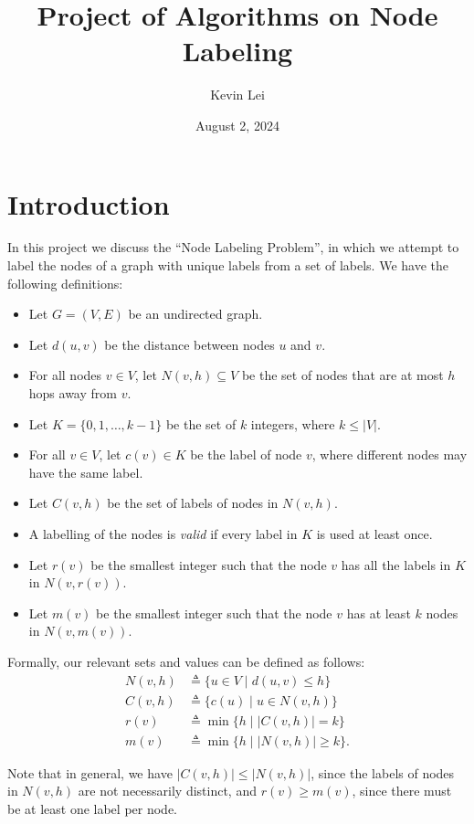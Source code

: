 \documentclass{article}
\title{Project of Algorithms on Node Labeling}
\author{Kevin Lei}
\date{August 2, 2024}
\begin{document}
\maketitle

\section{Introduction}

In this project we discuss the ``Node Labeling Problem'', in which we attempt to label the nodes of a graph with unique labels from a set of labels.
We have the following definitions:
\begin{itemize}
    \item Let $G = (V, E)$ be an undirected graph.
    \item Let $d(u, v)$ be the distance between nodes $u$ and $v$.
    \item For all nodes $v \in V$, let $N(v, h) \subseteq V$ be the set of nodes that are at most $h$ hops away from $v$.
    \item Let $K = \{0, 1, \ldots, k-1\}$ be the set of $k$ integers, where $k \leq |V|$.
    \item For all $v \in V$, let $c(v) \in K$ be the label of node $v$, where different nodes may have the same label.
    \item Let $C(v, h)$ be the set of labels of nodes in $N(v, h)$.
    \item A labelling of the nodes is \textit{valid} if every label in $K$ is used at least once.
    \item Let $r(v)$ be the smallest integer such that the node $v$ has all the labels in $K$ in $N(v, r(v))$.
    \item Let $m(v)$ be the smallest integer such that the node $v$ has at least $k$ nodes in $N(v, m(v))$.
\end{itemize}

Formally, our relevant sets and values can be defined as follows:
\begin{align*}
    N(v, h) &\triangleq \{u \in V \mid d(u, v) \leq h\} \\
    C(v, h) &\triangleq \{c(u) \mid u \in N(v, h)\} \\
    r(v) &\triangleq \min\{h \mid |C(v, h)| = k\} \\
    m(v) &\triangleq \min\{h \mid |N(v, h)| \geq k\}.
\end{align*}

Note that in general, we have $|C(v, h)| \leq |N(v, h)|$, since the labels of nodes in $N(v, h)$ are not necessarily distinct, 
and $r(v) \geq m(v)$, since there must be at least one label per node.
\end{document}
